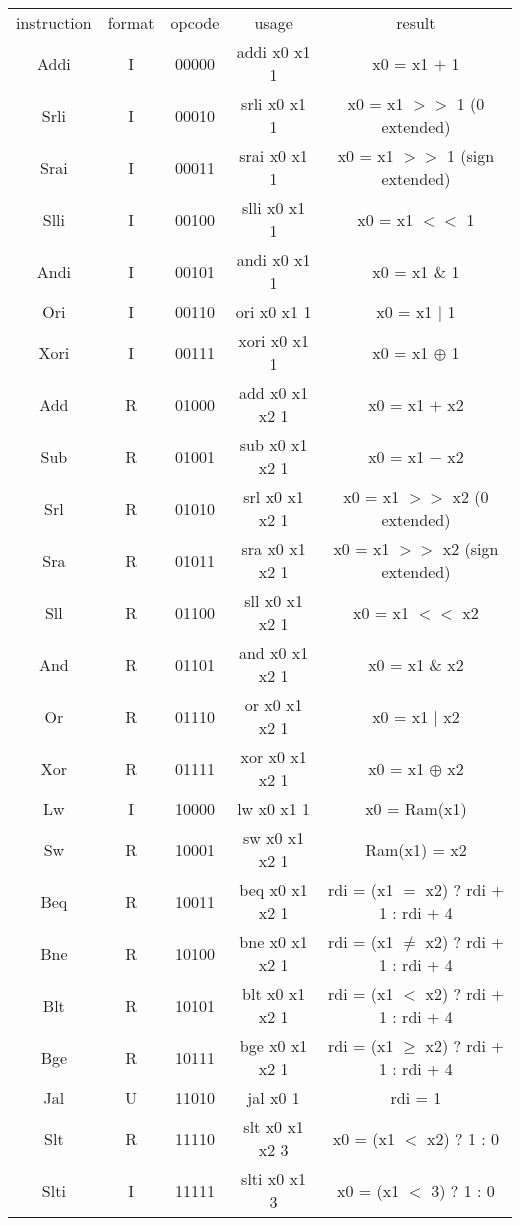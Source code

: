 \documentclass{article}
\begin{document}
\begin{center}
	\def\arraystretch{2.2}
	\begin{tabular}{c|c|c|c|c}
		instruction & format & opcode & usage & result\\
		\cline{1-5}
		Addi & I & 00000 & addi x0 x1 1 & x0 = x1 $+$ 1 \\
		Srli & I & 00010 & srli x0 x1 1 & x0 = x1 $>>$ 1 (0 extended)\\
		Srai & I & 00011 & srai x0 x1 1 & x0 = x1 $>>$ 1 (sign extended)\\
		Slli & I & 00100 & slli x0 x1 1 & x0 = x1 $<<$ 1 \\
		Andi & I & 00101 & andi x0 x1 1 & x0 = x1 \& 1 \\
		Ori & I & 00110 & ori x0 x1 1 & x0 = x1 $|$ 1 \\
		Xori & I & 00111 & xori x0 x1 1 & x0 = x1 $\oplus$ 1 \\
		Add & R & 01000 & add x0 x1 x2 1& x0 = x1 $+$ x2 \\
		Sub & R & 01001 & sub x0 x1 x2 1& x0 = x1 $-$ x2 \\
		Srl & R & 01010 & srl x0 x1 x2 1& x0 = x1 $>>$ x2 (0 extended)\\
		Sra & R & 01011 & sra x0 x1 x2 1& x0 = x1 $>>$ x2 (sign extended)\\
		Sll & R & 01100 & sll x0 x1 x2 1& x0 = x1 $<<$ x2 \\
		And & R & 01101 & and x0 x1 x2 1& x0 = x1 \& x2 \\
		Or & R & 01110 & or x0 x1 x2 1& x0 = x1 $|$ x2 \\
		Xor & R & 01111 & xor x0 x1 x2 1& x0 = x1 $\oplus$ x2 \\
		Lw & I & 10000 & lw x0 x1 1 & x0 = Ram(x1)\\
		Sw & R & 10001 & sw x0 x1 x2 1& Ram(x1) = x2\\
		Beq & R & 10011 & beq x0 x1 x2 1& rdi = (x1 $=$ x2) ? rdi + 1 : rdi + 4\\
		Bne & R & 10100 & bne x0 x1 x2 1& rdi = (x1 $\neq$ x2) ? rdi + 1 : rdi + 4\\
		Blt & R & 10101 & blt x0 x1 x2 1& rdi = (x1 $<$ x2) ? rdi + 1 : rdi + 4\\
		Bge & R & 10111 & bge x0 x1 x2 1& rdi = (x1 $\geq$ x2) ? rdi + 1 : rdi + 4\\
		Jal & U & 11010 & jal x0 1 & rdi = 1\\
		Slt & R & 11110 & slt x0 x1 x2 3 & x0 = (x1 $<$ x2) ? 1 : 0 \\
		Slti & I & 11111 & slti x0 x1 3 & x0 = (x1 $<$ 3) ? 1 : 0 \\
	\end{tabular}
\end{center} 
\end{document}
